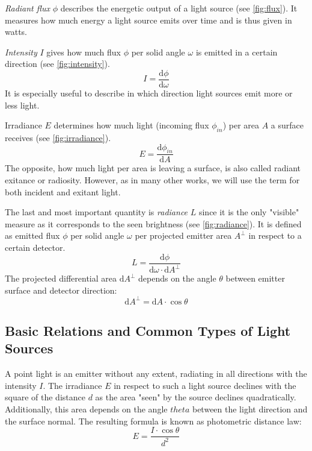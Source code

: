 \documentclass[thesis.tex]{subfiles}
\begin{document}
\emph{Radiant flux} $\phi$ describes the energetic output of a light source (see \autoref{fig:flux}).
It measures how much energy a light source emits over time and is thus given in watts.

\emph{Intensity} $I$ gives how much flux $\phi$ per solid angle $\omega$ is emitted in a certain direction (see \autoref{fig:intensity}).
\begin{equation}
I = \frac{\mathrm{d}\phi}{\mathrm{d}\omega}
\end{equation}
It is especially useful to describe in which direction light sources emit more or less light.

Irradiance $E$ determines how much light (incoming flux $\phi_{in}$) per area $A$ a surface receives (see \autoref{fig:irradiance}).
\begin{equation}
E = \frac{\mathrm{d}\phi_{in}}{\mathrm{d}A}
\end{equation}
The opposite, how much light per area is leaving a surface, is also called radiant exitance or radiosity.
However, as in many other works, we will use the term for both incident and exitant light.

The last and most important quantity is \emph{radiance} $L$ since it is the only "visible" measure as it corresponds to the seen brightness (see \autoref{fig:radiance}).
It is defined as emitted flux $\phi$ per solid angle $\omega$ per projected emitter area $A^\perp$ in respect to a certain detector.
\begin{equation}
L = \frac{\mathrm{d}\phi}{\mathrm{d}\omega \cdot \mathrm{d}A^\perp }
\end{equation}
The projected differential area $\mathrm{d}A^\perp$ depends on the angle $\theta$ between emitter surface and detector direction:
\begin{equation}
\mathrm{d}A^\perp = \mathrm{d}A \cdot \cos\theta
\end{equation}


\subsection{Basic Relations and Common Types of Light Sources} \label{sec:preq:theo:relation}
A point light is an emitter without any extent, radiating in all directions with the intensity $I$.
The irradiance  $E$ in respect to such a light source declines with the square of the distance $d$ as the area "seen" by the source declines quadratically.
Additionally, this area depends on the angle $theta$ between the light direction and the surface normal.
The resulting formula is known as photometric distance law:
\begin{equation}
E = \frac{I \cdot \cos\theta}{d^2}
\end{equation}
\end{document}
